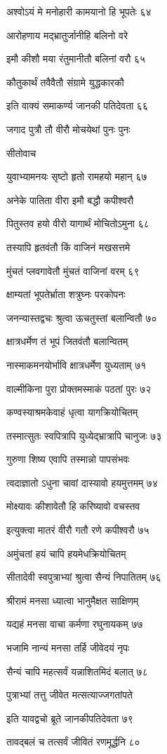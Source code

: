 अश्वोऽयं मे मनोहारी कामयानो हि भूपतेः ६४

आरोहणाय मद्भ्रातुर्जानीहि बलिनो वरे

इमौ कीशौ मया रंतुमानीतौ बलिनां वरौ ६५

कौतुकार्थं तवैवैतौ संग्रामे युद्धकारकौ

इति वाक्यं समाकर्ण्य जानकी पतिदेवता ६६

जगाद पुत्रौ तौ वीरौ मोचयेथां पुनः पुनः

सीतोवाच

युवाभ्यामनयः सृष्टो हृतो रामहयो महान् ६७

अनेके पातिता वीरा इमौ बद्धौ कपीश्वरौ

पितुस्तव हयो वीरो यागार्थं मोचितोऽमुना ६८

तस्यापि हृतवंतौ किं वाजिनं मखसत्तमे

मुंचतं प्लवगावेतौ मुंचतं वाजिनां वरम् ६९

क्षाम्यतां भूपतेर्भ्राता शत्रुघ्नः परकोपनः

जनन्यास्तद्वचः श्रुत्वा ऊचतुस्तां बलान्वितौ ७०

क्षात्रधर्मेण तं भूपं जितवंतौ बलान्वितम्

नास्माकमनयोर्भावि क्षात्रधर्मेण युध्यताम् ७१

वाल्मीकिना पुरा प्रोक्तमस्माकं पठतां पुरः ७२

कण्वस्याश्रमकेवाहं धृत्वा यागक्रियोचितम्

तस्मात्सुतः स्वपित्रापि युध्येद्भ्रात्रापि चानुजः ७३

गुरुणा शिष्य एवापि तस्मान्नो पापसंभवः

त्वदाज्ञातो ऽधुना चावां दास्यावो हयमुत्तमम् ७४

मोक्ष्यावः कीशावेतौ हि करिष्यावो वचस्तव

इत्युक्त्वा मातरं वीरौ गतौ रणे कपीश्वरौ ७५

अमुंचतां हयं चापि हयमेधक्रियोचितम्

सीतादेवी स्वपुत्राभ्यां श्रुत्वा सैन्यं निपातितम् ७६

श्रीरामं मनसा ध्यात्वा भानुमैक्षत साक्षिणम्

यद्यहं मनसा वाचा कर्मणा रघुनायकम् ७७

भजामि नान्यं मनसा तर्हि जीवेदयं नृपः

सैन्यं चापि महत्सर्वं यन्नाशितमिदं बलात् ७८

पुत्राभ्यां तत्तु जीवेत मत्सत्याज्जगतांपते

इति यावद्वचो ब्रूते जानकीपतिदेवता ७९

तावद्बलं च तत्सर्वं जीवितं रणमूर्द्धनि ८०


